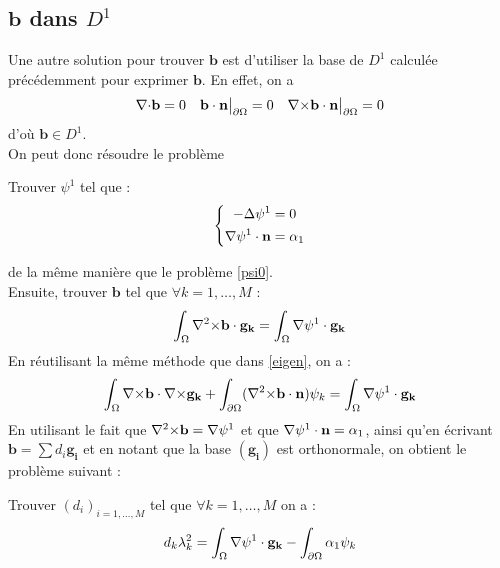 \subsection{$\mathbf{b}$ dans $D^1$}
Une autre solution pour trouver $\mathbf{b}$ est d'utiliser la base de $D^1$ calculée précédemment pour exprimer $\mathbf{b}$. En effet, on a
\[ {\nabla\cdot}\mathbf{b}=0\quad \mathbf{b}\cdot\mathbf{n}{\big\rvert_{\partial\Omega}}=0\quad {\nabla\times}\mathbf{b}\cdot\mathbf{n}{\big\rvert_{\partial\Omega}}=0\]
d'où $\mathbf{b}\in D^1$.\\
On peut donc résoudre le problème
\begin{pb}
Trouver $\psi^1$ tel que :
\begin{equation*}
\left\{ \begin{aligned}
-{\Delta}\psi^1 &= 0\\
{\nabla}\psi^1\cdot\mathbf{n} &= \alpha_1
\end{aligned}\right. \end{equation*}\end{pb}
de la même manière que le problème \ref{psi0}.\\
Ensuite, trouver $\mathbf{b}$ tel que $\forall k=1,\dots,M$ :
\[ \int_\Omega {\nabla^2\times}\mathbf{b}\cdot\mathbf{g_k} = \int_\Omega {\nabla}\psi^1\cdot\mathbf{g_k} \]
En réutilisant la même méthode que dans \ref{eigen}, on a :
\[ \int_\Omega {\nabla\times}\mathbf{b}\cdot{\nabla\times}\mathbf{g_k} + \int_{\partial\Omega}({\nabla^2\times}\mathbf{b}\cdot\mathbf{n})\psi_k = \int_\Omega {\nabla}\psi^1\cdot\mathbf{g_k} \]
En utilisant le fait que ${\nabla^2\times}\mathbf{b}={\nabla}\psi^1$ et que ${\nabla}\psi^1\cdot\mathbf{n}=\alpha_1$, ainsi qu'en écrivant $\mathbf{b}=\sum d_i\mathbf{g_i}$ et en notant que la base $(\mathbf{g_i})$ est orthonormale, on obtient le problème suivant :
\begin{pb}\label{pbbd1}
Trouver $(d_i)_{i=1,\dots,M}$ tel que $\forall k=1,\dots,M$ on a :
\[ d_k\lambda_k^2 = \int_\Omega {\nabla}\psi^1\cdot\mathbf{g_k} - \int_{\partial\Omega} \alpha_1\psi_k \]
\end{pb}


